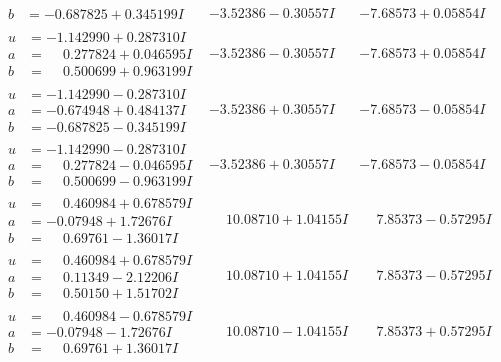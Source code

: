 \documentclass[1p]{elsarticle_modified}
\theoremstyle{definition}
\begin{document}
$$\begin{array}{c|c|c}
\begin{aligned}
b &= -0.687825 + 0.345199 I\end{aligned}
 & -3.52386 - 0.30557 I & -7.68573 + 0.05854 I \\ \hline\begin{aligned}
u &= -1.142990 + 0.287310 I \\
a &= \phantom{-}0.277824 + 0.046595 I \\
b &= \phantom{-}0.500699 + 0.963199 I\end{aligned}
 & -3.52386 - 0.30557 I & -7.68573 + 0.05854 I \\ \hline\begin{aligned}
u &= -1.142990 - 0.287310 I \\
a &= -0.674948 + 0.484137 I \\
b &= -0.687825 - 0.345199 I\end{aligned}
 & -3.52386 + 0.30557 I & -7.68573 - 0.05854 I \\ \hline\begin{aligned}
u &= -1.142990 - 0.287310 I \\
a &= \phantom{-}0.277824 - 0.046595 I \\
b &= \phantom{-}0.500699 - 0.963199 I\end{aligned}
 & -3.52386 + 0.30557 I & -7.68573 - 0.05854 I \\ \hline\begin{aligned}
u &= \phantom{-}0.460984 + 0.678579 I \\
a &= -0.07948 + 1.72676 I \\
b &= \phantom{-}0.69761 - 1.36017 I\end{aligned}
 & \phantom{-}10.08710 + 1.04155 I & \phantom{-}7.85373 - 0.57295 I \\ \hline\begin{aligned}
u &= \phantom{-}0.460984 + 0.678579 I \\
a &= \phantom{-}0.11349 - 2.12206 I \\
b &= \phantom{-}0.50150 + 1.51702 I\end{aligned}
 & \phantom{-}10.08710 + 1.04155 I & \phantom{-}7.85373 - 0.57295 I \\ \hline\begin{aligned}
u &= \phantom{-}0.460984 - 0.678579 I \\
a &= -0.07948 - 1.72676 I \\
b &= \phantom{-}0.69761 + 1.36017 I\end{aligned}
 & \phantom{-}10.08710 - 1.04155 I & \phantom{-}7.85373 + 0.57295 I \\ \hline\begin{aligned}

\end{aligned}
\end{array}$$
\end{document}
